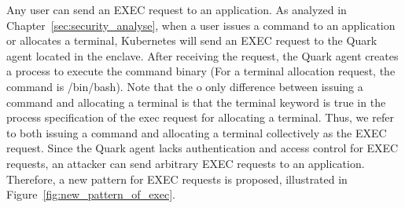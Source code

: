 Any user can send an EXEC request to an application. As analyzed in Chapter~\ref{sec:security_analyse}, when a user issues a command to an application or allocates a terminal, Kubernetes will send an EXEC request to the Quark agent located in the enclave. After receiving 
the request, the Quark agent creates a process to execute the command binary (For a terminal allocation request, the command is /bin/bash). Note that the o only difference between issuing a command and allocating a terminal is that the terminal 
keyword is true in the process specification of the exec request for allocating a terminal. Thus, we refer to both issuing a command and allocating a terminal collectively as the EXEC request. Since the Quark agent lacks authentication and access 
control for EXEC requests, an attacker can send arbitrary EXEC requests to an application. Therefore, a new pattern for EXEC requests is proposed, illustrated in Figure~\ref{fig:new_pattern_of_exec}.

